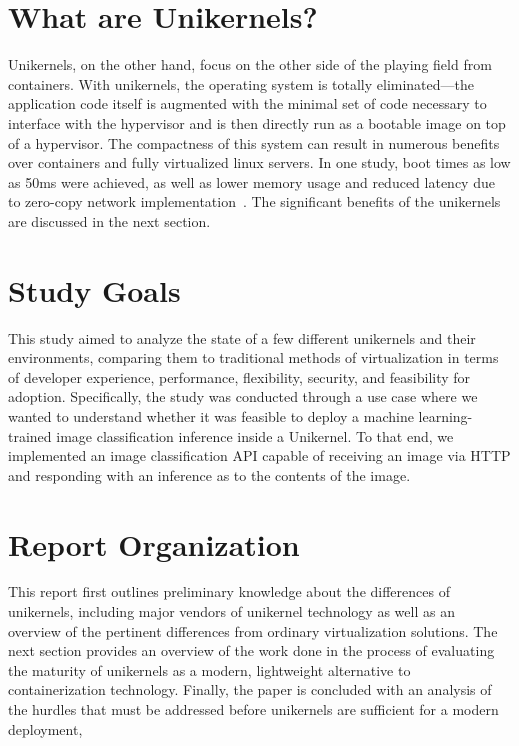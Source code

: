 \documentclass[conference]{IEEEtran}
\begin{document}
\section{What are Unikernels?}

Unikernels, on the other hand, focus on the other side of the
playing field from containers. With unikernels, the operating
system is totally eliminated—the application code itself is
augmented with the minimal set of code necessary to interface
with the hypervisor and is then directly run as a bootable image
on top of a hypervisor. The compactness of this system can result
in numerous benefits over containers and fully virtualized linux
servers. In one study, boot times as low as 50ms were achieved,
as well as lower memory usage and reduced latency due to
zero-copy network implementation~\cite{libos}. The significant
benefits of the unikernels are discussed in the next section.

\section{Study Goals}

This study aimed to analyze the state of a few different
unikernels and their environments, comparing them to traditional
methods of virtualization in terms of developer experience,
performance, flexibility, security, and feasibility for adoption.
Specifically, the study was conducted through a use case where we
wanted to understand whether it was feasible to deploy a machine
learning-trained image classification inference inside a
Unikernel. To that end, we implemented an image classification
API capable of receiving an image via HTTP and responding with an
inference as to the contents of the image. 

\section{Report Organization}

This report first outlines preliminary knowledge about the
differences of unikernels, including major vendors of unikernel
technology as well as an overview of the pertinent differences
from ordinary virtualization solutions. The next section provides
an overview of the work done in the process of evaluating
the maturity of unikernels as a modern, lightweight alternative
to containerization technology. Finally, the paper is concluded
with an analysis of the hurdles that must be addressed before
unikernels are sufficient for a modern deployment, 
\end{document}
